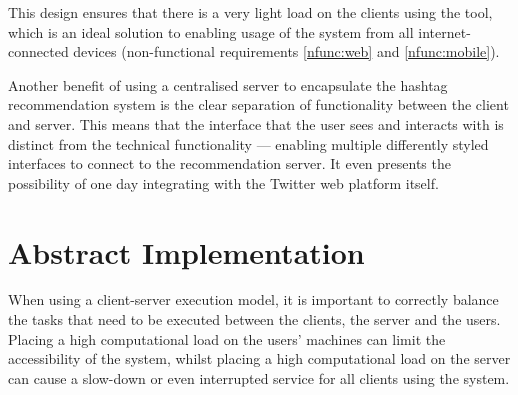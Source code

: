 \documentclass[11pt,a4paper]{report}
\begin{document}
This design ensures that there is a very light load on the clients using the tool, which is an ideal solution to enabling usage of the system from all internet-connected devices (non-functional requirements \ref{nfunc:web} and \ref{nfunc:mobile}).

Another benefit of using a centralised server to encapsulate the hashtag recommendation system is the clear separation of functionality between the client and server. This means that the interface that the user sees and interacts with is distinct from the technical functionality --- enabling multiple differently styled interfaces to connect to the recommendation server. It even presents the possibility of one day integrating with the Twitter web platform itself.

\section{Abstract Implementation}

When using a client-server execution model, it is important to correctly balance the tasks that need to be executed between the clients, the server and the users. Placing a high computational load on the users' machines can limit the accessibility of the system, whilst placing a high computational load on the server can cause a slow-down or even interrupted service for all clients using the system.
\end{document}
